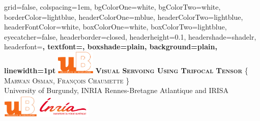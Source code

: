 \documentclass[portrait,final,a0paper,fontscale=0.285]{baposter}
\begin{document}
\begin{poster}%
  {
  grid=false,
  colspacing=1em,
  bgColorOne=white,
  bgColorTwo=white,
  borderColor=lightblue,
  headerColorOne=mblue,
  headerColorTwo=lightblue,
  headerFontColor=white,
  boxColorOne=white,
  boxColorTwo=lightblue,
  eyecatcher=false,
  headerborder=closed,
  headerheight=0.1\textheight,
  headershade=shadelr,
  headerfont=\Large\bf\textsc, %
  textfont={\setlength{\parindent}{1.5em}},
  boxshade=plain,
  background=plain,
  linewidth=1pt
  }
  {\includegraphics[height=3em]{figures/ublogo.jpg}}
  {\bf\textsc{Visual Servoing Using Trifocal Tensor}\vspace{0.5em}}
{\textsc{\{ Marwan Osman, Fran\c{c}ois Chaumette \}}\\ \small{University of Burgundy, INRIA Rennes-Bretagne Atlantique and IRISA}} %
  {%
    \includegraphics[height=3em]{figures/ubinrialogo.jpg}
  }

    \newcommand{\colouredcircle}{%
      \tikz{\useasboundingbox (-0.2em,-0.32em) rectangle(0.2em,0.32em); \draw[draw=black,fill=lightblue,line width=0.03em] (0,0) circle(0.18em);}}


\end{poster}
\end{document}
